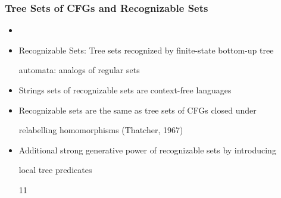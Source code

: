 \documentclass[compress,color=usenames]{beamer}
\begin{document}
\begin{frame}
\frametitle{Tree Sets of CFGs and Recognizable Sets}


\begin{itemize}
\item



\item Recognizable Sets: Tree sets recognized by ﬁnite-state bottom-up tree


automata: analogs of regular sets





\item Strings sets of recognizable sets are context-free languages





\item Recognizable sets are the same as tree sets of CFGs closed under


relabelling homomorphisms (Thatcher, 1967)





\item Additional strong generative power of recognizable sets by introducing


local tree predicates


11




\end{itemize}

\end{frame}
\end{document}
